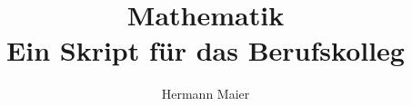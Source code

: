 \documentclass[a4paper,12pt, headsepline, ngerman]{scrartcl}
\theoremstyle{definition}
\newcommand{\fakesection}[1]{%
	\par\refstepcounter{section}%
	\sectionmark{#1}%
	\addcontentsline{toc}{section}{\protect\numberline{\thesection}#1}%
}
\newcommand{\fakesubsection}[1]{%
	\par\refstepcounter{subsection}%
	\subsectionmark{#1}%
	\addcontentsline{toc}{subsection}{\protect\numberline{\thesubsection}#1}%
}
\begin{document}
    \newlength{\imgheight}
    \newlength{\qrheight}
	\setlength\parindent{0pt} %
    \setlength\tabcolsep{6pt}
	\cofoot[\pagemark]{\pagemark}
	\title{Mathematik\\
		Ein Skript für das Berufskolleg}
	\author{Hermann Maier}

	\def\grundlagen{./Arbeitsblaetter/Grundlagen}
	\def\linFkt{./Arbeitsblaetter/LineareFunktionen}
	\def\quadFkt{./Arbeitsblaetter/QuadratischeFunktionen}
	\def\ganzFkt{./Arbeitsblaetter/GanzrationaleFunktionen}
	\def\eFkt{./Arbeitsblaetter/EFunktionen}
	\def\ableitung{./Arbeitsblaetter/Ableitung}
	\def\lgs{./Arbeitsblaetter/LGS}
	\def\optimierung{./Arbeitsblaetter/Optimierung}
	\def\integration{./Arbeitsblaetter/Integration}
	\def\trigonometrie{./Arbeitsblaetter/Trigonometrie}
%	
%	
%	
%	
%	
%	
%	
%	
%	
%	
%	
%	
\end{document}

